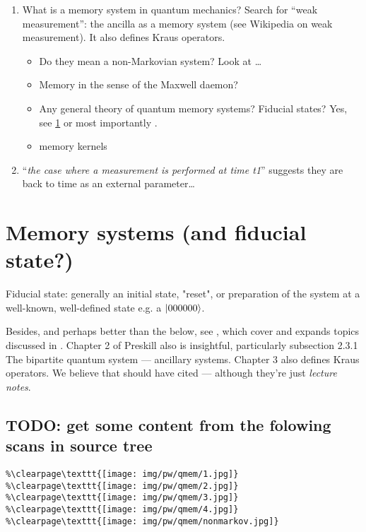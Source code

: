 \begin{enumerate}
  \item What is a memory system in quantum mechanics? Search for ``weak measurement'': the ancilla as a memory system (see Wikipedia on weak measurement). It also defines Kraus operators.
  \begin{itemize}
    \item Do they mean a non-Markovian system? Look at \cite{MeasurementMarkovian}\dots
    \item Memory in the sense of the Maxwell daemon?
    \item
      Any general theory of quantum memory systems? Fiducial states?
      Yes, see \ref{sec:qmemory} or most importantly \cite[Ch.~3]{PreskillNotes}.
    \item memory kernels \cite{CarmichaelOQS2017}
  \end{itemize}
  \item ``\emph{the case where a measurement is performed at time t1}'' suggests they are back to time as an external parameter\dots
\end{enumerate}

\section{Memory systems (and fiducial state?)}\label{sec:qmemory}

Fiducial state: generally an initial state, "reset", or
preparation of the system at a well-known, well-defined state
e.g. a $\ket{000000}$.

Besides, and perhaps better than the below, see \cite[Ch.~3]{PreskillNotes},
which cover and expands topics discussed in \cite{open_systems}. Chapter 2
of Preskill \cite{PreskillNotes} also is insightful, particularly
subsection 2.3.1 The bipartite quantum system --- ancillary systems. Chapter 3
also defines Kraus operators. We believe that \cite{Lloyd:Time} should
have cited \cite{PreskillNotes} --- although they're just \emph{lecture notes}.

\subsection{TODO: get some content from the folowing scans in source tree}
\begin{verbatim}
%\clearpage\texttt{[image: img/pw/qmem/1.jpg]}
%\clearpage\texttt{[image: img/pw/qmem/2.jpg]}
%\clearpage\texttt{[image: img/pw/qmem/3.jpg]}
%\clearpage\texttt{[image: img/pw/qmem/4.jpg]}
%\clearpage\texttt{[image: img/pw/qmem/nonmarkov.jpg]}
\end{verbatim}

